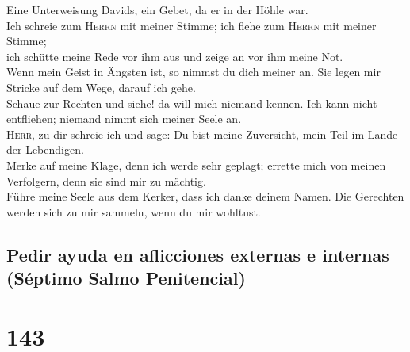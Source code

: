  Eine Unterweisung Davids, ein Gebet, da er in der Höhle
war.\\
 Ich schreie zum \textsc{Herrn} mit meiner Stimme; ich
flehe zum \textsc{Herrn} mit meiner Stimme;\\
 ich schütte meine Rede vor ihm aus und zeige an vor ihm
meine Not.\\
 Wenn mein Geist in Ängsten ist, so nimmst du dich meiner
an. Sie legen mir Stricke auf dem Wege, darauf ich gehe.\\
 Schaue zur Rechten und siehe! da will mich niemand
kennen. Ich kann nicht entfliehen; niemand nimmt sich meiner Seele an.\\
 \textsc{Herr}, zu dir schreie ich und sage: Du bist meine
Zuversicht, mein Teil im Lande der Lebendigen.\\
 Merke auf meine Klage, denn ich werde sehr geplagt;
errette mich von meinen Verfolgern, denn sie sind mir zu mächtig.\\
 Führe meine Seele aus dem Kerker, dass ich danke deinem
Namen. Die Gerechten werden sich zu mir sammeln, wenn du mir wohltust.

\hypertarget{pedir-ayuda-en-aflicciones-externas-e-internas-suxe9ptimo-salmo-penitencial}{%
\subsection{Pedir ayuda en aflicciones externas e internas (Séptimo
Salmo
Penitencial)}\label{pedir-ayuda-en-aflicciones-externas-e-internas-suxe9ptimo-salmo-penitencial}}

\hypertarget{section-142}{%
\section{143}\label{section-142}}

